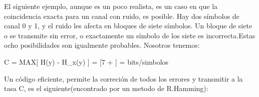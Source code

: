 El siguiente ejemplo, aunque es un poco realista, es un caso en que la coincidencia exacta para un canal con ruido, 
es posible. Hay dos s\'imbolos de canal 0 y 1, y el ruido les afecta en bloques de siete s\'imbolos. 
Un bloque de siete o se transmite sin error, o exactamente un s\'imbolo de los siete es incorrecta.Estas 
ocho posibilidades son igualmente probables. Nosotros tenemos:

\begin{center}
C = MAX[ H(y) - H_x(y) ]
= [7 + ]
= bits/simbolos
\end{center}
 
Un c\'odigo eficiente, permite la correci\'on de todos los errores y transmitir a la tasa C, es el 
siguiente(encontrado por un metodo de R.Hamming):
 



